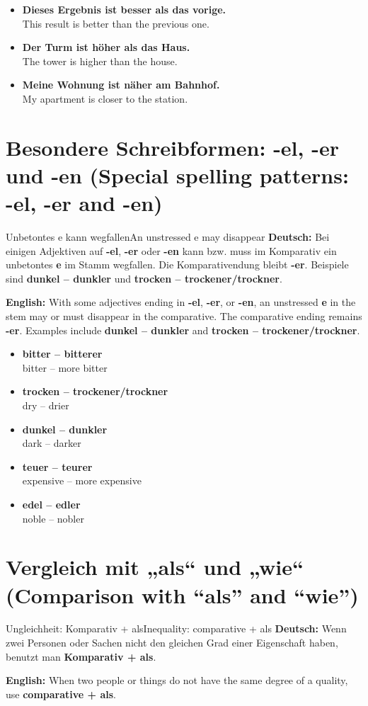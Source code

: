 \documentclass[a4paper,11pt]{article}
\newcommand{\GermanText}[1]{\textbf{Deutsch: }#1\par}
\newcommand{\EnglishText}[1]{{\small\color{SoftGray}\textbf{English: }#1\par}}
\newcommand{\ExampleItem}[2]{\item \textbf{#1}\\{\small\color{SoftGray}#2}}
\begin{document}
\begin{exbox}
\begin{itemize}
\ExampleItem{Dieses Ergebnis ist besser als das vorige.}{This result is better than the previous one.}
\ExampleItem{Der Turm ist höher als das Haus.}{The tower is higher than the house.}
\ExampleItem{Meine Wohnung ist näher am Bahnhof.}{My apartment is closer to the station.}
\end{itemize}
\end{exbox}

\section{Besondere Schreibformen: -el, -er und -en \textnormal{(Special spelling patterns: -el, -er and -en)}}

\begin{grammarentry}{Unbetontes e kann wegfallen}{An unstressed e may disappear}
\GermanText{Bei einigen Adjektiven auf \textbf{-el}, \textbf{-er} oder \textbf{-en} kann bzw. muss im Komparativ ein unbetontes \textbf{e} im Stamm wegfallen. Die Komparativendung bleibt \textbf{-er}. Beispiele sind \textbf{dunkel -- dunkler} und \textbf{trocken -- trockener/trockner}.}
\EnglishText{With some adjectives ending in \textbf{-el}, \textbf{-er}, or \textbf{-en}, an unstressed \textbf{e} in the stem may or must disappear in the comparative. The comparative ending remains \textbf{-er}. Examples include \textbf{dunkel -- dunkler} and \textbf{trocken -- trockener/trockner}.}
\end{grammarentry}

\begin{exbox}
\begin{itemize}
\ExampleItem{bitter -- bitterer}{bitter -- more bitter}
\ExampleItem{trocken -- trockener/trockner}{dry -- drier}
\ExampleItem{dunkel -- dunkler}{dark -- darker}
\ExampleItem{teuer -- teurer}{expensive -- more expensive}
\ExampleItem{edel -- edler}{noble -- nobler}
\end{itemize}
\end{exbox}

\section{Vergleich mit „als“ und „wie“ \textnormal{(Comparison with “als” and “wie”)}}

\begin{grammarentry}{Ungleichheit: Komparativ + als}{Inequality: comparative + als}
\GermanText{Wenn zwei Personen oder Sachen nicht den gleichen Grad einer Eigenschaft haben, benutzt man \textbf{Komparativ + als}.}
\EnglishText{When two people or things do not have the same degree of a quality, use \textbf{comparative + als}.}
\end{grammarentry}
\end{document}
